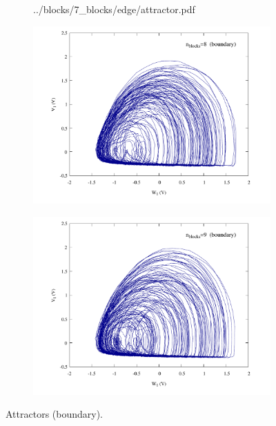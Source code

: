 \begin{figure}
\begin{minipage}{.47\textwidth}
\begin{subfigure}{\linewidth}
            {../blocks/7_blocks/edge/attractor.pdf}
        \end{subfigure}
    \end{minipage}
    \begin{minipage}{.47\textwidth}
        \begin{subfigure}{\linewidth}
            \centering
            \includegraphics[width=\linewidth]
            {../blocks/8_blocks/attractor.pdf}
        \end{subfigure}
    \end{minipage}
    \begin{minipage}{.47\textwidth}
        \begin{subfigure}{\linewidth}
            \centering
            \includegraphics[width=\linewidth]
            {../blocks/9_blocks/edge/attractor.pdf}
        \end{subfigure}
    \end{minipage}
    \caption{Attractors (boundary).}
    \label{fig:attractors 2-9}
\end{figure}

